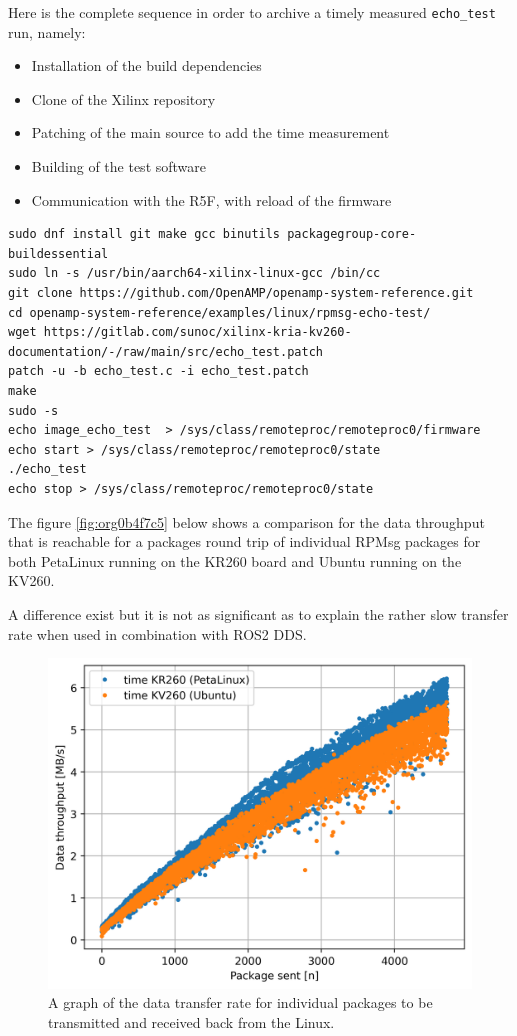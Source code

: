 \documentclass[10pt]{article}
\begin{document}
Here is the complete sequence in order to archive a timely measured \texttt{echo\_test} run, namely:
\begin{itemize}
\item Installation of the build dependencies
\item Clone of the Xilinx repository
\item Patching of the main source to add the time measurement
\item Building of the test software
\item Communication with the R5F, with reload of the firmware
\end{itemize}
\begin{verbatim}
sudo dnf install git make gcc binutils packagegroup-core-buildessential
sudo ln -s /usr/bin/aarch64-xilinx-linux-gcc /bin/cc
git clone https://github.com/OpenAMP/openamp-system-reference.git
cd openamp-system-reference/examples/linux/rpmsg-echo-test/
wget https://gitlab.com/sunoc/xilinx-kria-kv260-documentation/-/raw/main/src/echo_test.patch
patch -u -b echo_test.c -i echo_test.patch
make
sudo -s
echo image_echo_test  > /sys/class/remoteproc/remoteproc0/firmware
echo start > /sys/class/remoteproc/remoteproc0/state
./echo_test
echo stop > /sys/class/remoteproc/remoteproc0/state
\end{verbatim}


The figure \ref{fig:org0b4f7c5} below shows a comparison for the data
throughput that is reachable for a packages round trip of individual RPMsg
packages for both PetaLinux running on the KR260 board and Ubuntu running on the
KV260.

A difference exist but it is not as significant as to explain the rather slow
transfer rate when used in combination with ROS2 DDS.

\begin{figure}[htbp]
\centering
\includegraphics[width=.6\textwidth]{./img/kr260_echo_test_density.png}
\caption{\label{fig:org5f120c8}A graph of the data transfer rate for individual packages to be transmitted and received back from the Linux.}
\end{figure}
\end{document}
